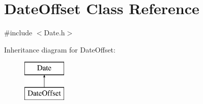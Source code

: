 \hypertarget{class_date_offset}{}\section{Date\+Offset Class Reference}
\label{class_date_offset}


{\ttfamily \#include $<$Date.\+h$>$}

Inheritance diagram for Date\+Offset\+:\begin{figure}[H]
\begin{center}
\leavevmode
\includegraphics[height=2.000000cm]{class_date_offset}
\end{center}
\end{figure}
